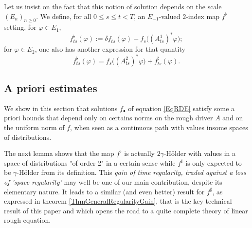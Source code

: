 \documentclass[11pt,a4paper]{amsart}
\renewcommand{\leq}{\leqslant}
\renewcommand{\geq}{\geqslant}
\newcommand{\ssk}{\smallskip}
\numberwithin{equation}{section} %
\begin{document}
\ssk

Let us insist on the fact that this notion of solution depends on the scale $(E_n)_{n\geq 0}$. We define, for all $0\leq s\leq t<T$, an  $E_{-1}$-valued $2$-index map $f^\flat$ setting, for $\varphi\in E_1$,
\begin{equation*}
f^\flat_{ts}(\varphi) := \delta f_{ts}(\varphi) - f_s\big((A_{ts}^1)^*\varphi\big);
\end{equation*}
for $\varphi\in E_2$, one also has another expression for that quantity
$$
f^\flat_{ts}(\varphi) = f_s\big((A^2_{ts})^*\varphi\big) + f^\sharp_{ts}(\varphi).
$$


\bigskip


\subsection{A priori estimates}
\label{SubsectionAPrioriEstimates}

We show in this section that solutions $f_\bullet$ of equation \eqref{EqRDE} satisfy some a priori bounds that depend only on certains norms on the rough driver $A$ and on the uniform norm of $f$, when seen as a continuous path with values insome spaces of distributions. 

\ssk

The next lemma shows that the map $f^\flat$ is actually $2\gamma$-H\"older with values in a  space of distributions "of order 2" in a certain sense while $f^\sharp$ is only expected to be $\gamma$-H\"older from its definition. This \textit{gain of time regularity, traded against a loss of 'space regularity'} may well be one of our main contribution, despite its elementary nature. It leads to a similar (and even better) result for $f^\sharp$, as expressed in theorem \ref{ThmGeneralRegularityGain}, that is the key technical result of this paper and which opens the road  to a quite complete theory of linear rough equation.
\end{document}
